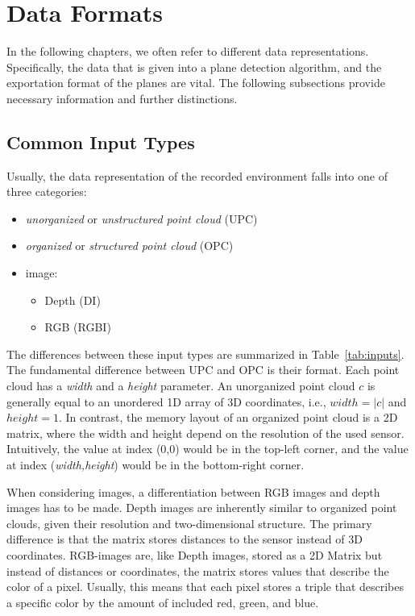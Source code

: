 \documentclass[main.tex]{subfiles}
\begin{document}
\section{Data Formats}
\label{sec:dataformats}
In the following chapters, we often refer to different data representations. Specifically, the data that is given into a plane detection algorithm, and
the exportation format of the planes are vital. The following subsections provide necessary information and further distinctions.


\subsection{Common Input Types}
\label{subsec:input}
Usually, the data representation of the recorded environment falls into one of three categories:
\begin{itemize}
    \item \textit{unorganized} or \textit{unstructured point cloud} (UPC)
    \item \textit{organized} or \textit{structured point cloud} (OPC)
    \item image:
          \begin{itemize}
              \item Depth (DI)
              \item RGB (RGBI)
          \end{itemize}
\end{itemize}

The differences between these input types are summarized in Table~\ref{tab:inputs}.
The fundamental difference between UPC and OPC is their format. Each point cloud has a \textit{width} and a \textit{height} parameter.
An unorganized point cloud $c$ is generally equal to an unordered 1D array of 3D coordinates, i.e., $width = |c|$ and $height=1$.
In contrast, the memory layout of an organized point cloud is a 2D matrix, where the width and height depend on the resolution of the used sensor.
Intuitively, the value at index (0,0) would be in the top-left corner, and the value at index (\textit{width,height}) would be in the bottom-right corner.

When considering images, a differentiation between RGB images and depth images has to be made.
Depth images are inherently similar to organized point clouds, given their resolution and two-dimensional structure.
The primary difference is that the matrix stores distances to the sensor instead of 3D coordinates.
RGB-images are, like Depth images, stored as a 2D Matrix but instead of distances or coordinates, the matrix stores
values that describe the color of a pixel. Usually, this means that each pixel stores a triple that describes a specific
color by the amount of included red, green, and blue.
\end{document}
